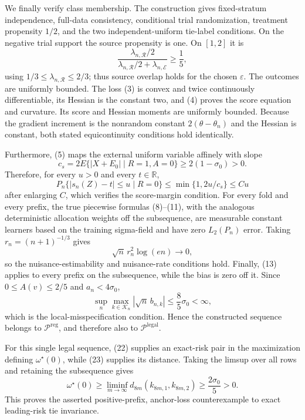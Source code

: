 We finally verify class membership.  The construction gives fixed-stratum independence, full-data consistency, conditional trial randomization, treatment propensity \(1/2\), and the two independent-uniform tie-label conditions.  On the negative trial support the source propensity is one.  On \([1,2]\) it is
\[
 \frac{\lambda_{n,\mathcal R}/2}
 {\lambda_{n,\mathcal R}/2+\lambda_{n,\mathcal E}}
 \geq\frac15,
\]
using \(1/3\leq\lambda_{n,\mathcal R}\leq2/3\); thus source overlap holds for the chosen \(\varepsilon\).  The outcomes are uniformly bounded.  The loss (3) is convex and twice continuously differentiable, its Hessian is the constant two, and (4) proves the score equation and curvature.  Its score and Hessian moments are uniformly bounded.  Because the gradient increment is the nonrandom constant \(2(\theta-\theta_n)\) and the Hessian is constant, both stated equicontinuity conditions hold identically.

Furthermore, (5) maps the external uniform variable affinely with slope
\[
 c_s=2E\{|X+E_0|\mid R=1,A=0\}\geq2(1-\sigma_0)>0.
\]
Therefore, for every \(u>0\) and every \(t\in\mathbb R\),
\[
 P_n\{|s_n(Z)-t|\leq u\mid R=0\}
 \leq \min\{1,2u/c_s\}
 \leq C u
\]
after enlarging \(C\), which verifies the score-margin condition.  For every fold and every prefix, the true piecewise formulas (8)--(11), with the analogous deterministic allocation weights off the subsequence, are measurable constant learners based on the training sigma-field and have zero \(L_2(P_n)\) error.  Taking \(r_n=(n+1)^{-1/3}\) gives
\[
 \sqrt n\,r_n^2\log(en)\longrightarrow0,
\]
so the nuisance-estimability and nuisance-rate conditions hold.  Finally, (13) applies to every prefix on the subsequence, while the bias is zero off it.  Since \(0\leq A(v)\leq2/5\) and \(a_n<4\sigma_0\),
\[
 \sup_n\max_{k\in\mathcal K_n}|\sqrt n\,b_{n,k}|
 \leq\frac85\sigma_0<\infty,
\]
which is the local-misspecification condition.  Hence the constructed sequence belongs to \(\mathcal P^{\mathrm{reg}}\), and therefore also to \(\mathcal P^{\mathrm{legal}}\).

For this single legal sequence, (22) supplies an exact-risk pair in the maximization defining \(\omega^{\star}(0)\), while (23) supplies its distance.  Taking the limsup over all rows and retaining the subsequence gives
\[
 \omega^{\star}(0)
 \geq\liminf_{m\to\infty}
 d_{8m}(k_{8m,1},k_{8m,2})
 \geq\frac{2\sigma_0}{5}>0.
\]
This proves the asserted positive-prefix, anchor-loss counterexample to exact leading-risk tie invariance.
